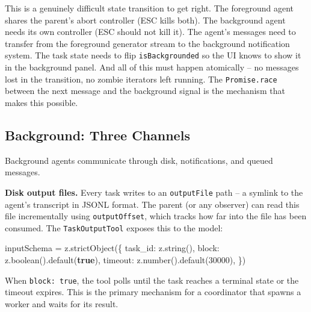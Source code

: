 \documentclass[
  english,
  11pt,
  letterpaper,
]{book}
\newenvironment{Shaded}{\begin{snugshade}}{\end{snugshade}}
\newcommand{\DecValTok}[1]{\textcolor[rgb]{0.68,0.00,0.00}{#1}}
\newcommand{\FunctionTok}[1]{\textcolor[rgb]{0.28,0.35,0.67}{#1}}
\newcommand{\KeywordTok}[1]{\textcolor[rgb]{0.00,0.23,0.31}{\textbf{#1}}}
\newcommand{\NormalTok}[1]{\textcolor[rgb]{0.00,0.23,0.31}{#1}}
\newcommand{\OperatorTok}[1]{\textcolor[rgb]{0.37,0.37,0.37}{#1}}
\begin{document}
This is a genuinely difficult state transition to get right. The
foreground agent shares the parent's abort controller (ESC kills both).
The background agent needs its own controller (ESC should not kill it).
The agent's messages need to transfer from the foreground generator
stream to the background notification system. The task state needs to
flip \texttt{isBackgrounded} so the UI knows to show it in the
background panel. And all of this must happen atomically -- no messages
lost in the transition, no zombie iterators left running. The
\texttt{Promise.race} between the next message and the background signal
is the mechanism that makes this possible.

\subsection{Background: Three Channels}\label{background-three-channels}

Background agents communicate through disk, notifications, and queued
messages.

\textbf{Disk output files.} Every task writes to an \texttt{outputFile}
path -- a symlink to the agent's transcript in JSONL format. The parent
(or any observer) can read this file incrementally using
\texttt{outputOffset}, which tracks how far into the file has been
consumed. The \texttt{TaskOutputTool} exposes this to the model:

\begin{Shaded}
\begin{Highlighting}[]
\NormalTok{inputSchema }\OperatorTok{=}\NormalTok{ z}\OperatorTok{.}\FunctionTok{strictObject}\NormalTok{(\{}
\NormalTok{  task\_id}\OperatorTok{:}\NormalTok{ z}\OperatorTok{.}\FunctionTok{string}\NormalTok{()}\OperatorTok{,}
\NormalTok{  block}\OperatorTok{:}\NormalTok{ z}\OperatorTok{.}\FunctionTok{boolean}\NormalTok{()}\OperatorTok{.}\FunctionTok{default}\NormalTok{(}\KeywordTok{true}\NormalTok{)}\OperatorTok{,}
\NormalTok{  timeout}\OperatorTok{:}\NormalTok{ z}\OperatorTok{.}\FunctionTok{number}\NormalTok{()}\OperatorTok{.}\FunctionTok{default}\NormalTok{(}\DecValTok{30000}\NormalTok{)}\OperatorTok{,}
\NormalTok{\})}
\end{Highlighting}
\end{Shaded}

When \texttt{block:\ true}, the tool polls until the task reaches a
terminal state or the timeout expires. This is the primary mechanism for
a coordinator that spawns a worker and waits for its result.
\end{document}
